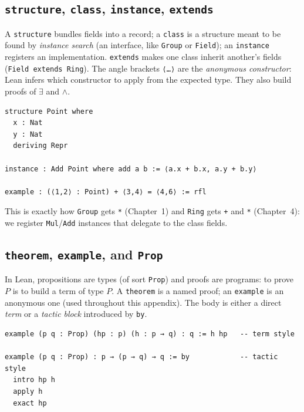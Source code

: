 \documentclass[11pt, a4paper, oneside]{book}
\newcommand{\lc}[1]{\texttt{#1}}
\begin{document}
\subsection*{\lc{structure}, \lc{class}, \lc{instance}, \lc{extends}}

A \lc{structure} bundles fields into a record; a \lc{class} is a structure meant
to be found by \emph{instance search} (an interface, like \lc{Group} or
\lc{Field}); an \lc{instance} registers an implementation. \lc{extends} makes
one class inherit another's fields (\lc{Field extends Ring}). The angle brackets
\lc{⟨…⟩} are the \emph{anonymous constructor}: Lean infers which constructor to
apply from the expected type. They also build proofs of $\exists$ and $\land$.

\begin{leanbox}
\begin{verbatim}
structure Point where
  x : Nat
  y : Nat
  deriving Repr

instance : Add Point where add a b := ⟨a.x + b.x, a.y + b.y⟩

example : (⟨1,2⟩ : Point) + ⟨3,4⟩ = ⟨4,6⟩ := rfl
\end{verbatim}
\end{leanbox}

This is exactly how \lc{Group} gets \lc{*} (Chapter~1) and \lc{Ring} gets \lc{+}
and \lc{*} (Chapter~4): we register \lc{Mul}/\lc{Add} instances that delegate to
the class fields.

\subsection*{\lc{theorem}, \lc{example}, and \lc{Prop}}

In Lean, propositions are types (of sort \lc{Prop}) and proofs are programs: to
prove $P$ is to build a term of type $P$. A \lc{theorem} is a named proof; an
\lc{example} is an anonymous one (used throughout this appendix). The body is
either a direct \emph{term} or a \emph{tactic block} introduced by \lc{by}.

\begin{leanbox}
\begin{verbatim}
example (p q : Prop) (hp : p) (h : p → q) : q := h hp   -- term style

example (p q : Prop) : p → (p → q) → q := by            -- tactic style
  intro hp h
  apply h
  exact hp
\end{verbatim}
\end{leanbox}
\end{document}
